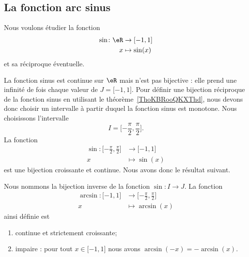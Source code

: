 \subsection{La fonction arc sinus}

Nous voulons étudier la fonction
\begin{equation}		\label{EQooUPJIooSvBNZy}
	\begin{aligned}
		\sin\colon \eR & \to \mathopen[ -1 , 1 \mathclose] \\
		x              & \mapsto \sin(x)
	\end{aligned}
\end{equation}
et sa réciproque éventuelle.

La fonction sinus est continue sur \( \eR\) mais n'est pas bijective : elle prend une infinité de fois chaque valeur de \( J=\mathopen[ -1 , 1 \mathclose]\). Pour définir une bijection réciproque de la fonction sinus en utilisant le théorème~\ref{ThoKBRooQKXThd}, nous devons donc choisir un intervalle à partir duquel la fonction sinus est monotone. Nous choisissons l'intervalle
\begin{equation}
	I=\mathopen[ -\frac{ \pi }{ 2 } , \frac{ \pi }{2} \mathclose].
\end{equation}
La fonction
\begin{equation}
	\begin{aligned}
		\sin\colon \mathopen[ -\frac{ \pi }{2} , \frac{ \pi }{2} \mathclose] & \to \mathopen[ -1 , 1 \mathclose] \\
		x                                                                    & \mapsto \sin(x)
	\end{aligned}
\end{equation}
est une bijection croissante et continue. Nous avons donc le résultat suivant.
\begin{theorem}
	Nous nommons  la bijection inverse de la fonction \( \sin\colon I\to J\). La fonction
	\begin{equation}
		\begin{aligned}
			\arcsin\colon \mathopen[ -1 , 1 \mathclose] & \to \mathopen[ -\frac{ \pi }{2} , \frac{ \pi }{2} \mathclose] \\
			x                                           & \mapsto \arcsin(x)
		\end{aligned}
	\end{equation}
	ainsi définie est
	\begin{enumerate}
		\item
		      continue et strictement croissante;
		\item
		      impaire : pour tout \( x\in\mathopen[ -1 , 1 \mathclose]\) nous avons \( \arcsin(-x)=-\arcsin(x)\).
	\end{enumerate}
\end{theorem}

